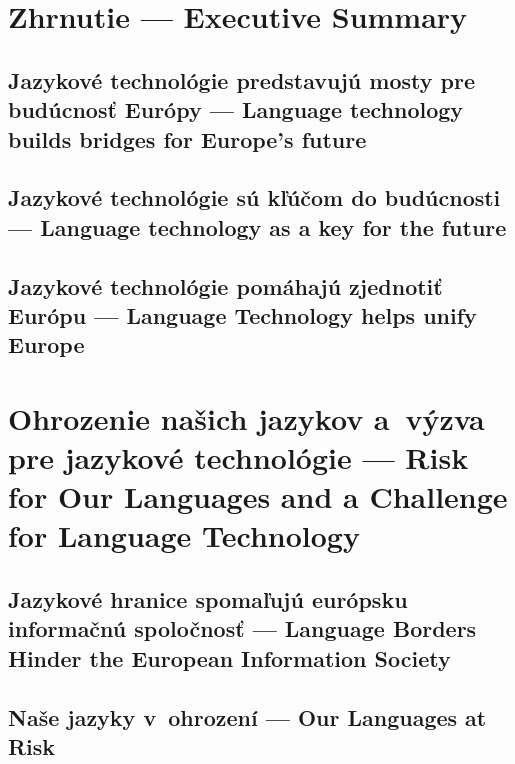 \documentclass[paper=a4]{scrartcl}
\newcommand{\wpsk}[1]{\ParallelLText{\begin{slovak}\setlength\parindent{1em}\frenchspacing#1\end{slovak}}}
\newcommand{\wpen}[1]{\ParallelRText{\begin{english}\setlength\parindent{0pt}\nonfrenchspacing#1\end{english}}}
\begin{document}
\begin{Parallel}[c]{70mm}{70mm}

\section{Zhrnutie --- Executive Summary}
\subsection{Jazykové technológie predstavujú mosty pre budúcnosť Európy --- Language technology builds bridges for Europe’s future}
\wpsk{}
\wpen{}
\ParallelPar

\subsection{Jazykové technológie sú kľúčom do budúcnosti --- Language technology as a key for the future}
\wpsk{}
\wpen{}
\ParallelPar

\subsection{Jazykové technológie pomáhajú zjednotiť Európu --- Language Technology helps unify Europe}
\wpsk{}
\wpen{}
\ParallelPar

\section{Ohrozenie našich jazykov a výzva pre jazykové technológie --- Risk for Our Languages and a Challenge for Language Technology}
\wpsk{}
\wpen{}
\ParallelPar

\subsection{Jazykové hranice spomaľujú európsku informačnú spoločnosť --- Language Borders Hinder the European Information Society}
\wpsk{}
\wpen{}
\ParallelPar

\subsection{Naše jazyky v ohrození --- Our Languages at Risk}
\wpsk{}
\wpen{}
\ParallelPar


\end{Parallel}
\end{document}
